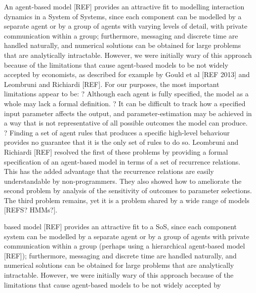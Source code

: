 \documentclass{article}
\begin{document}
An agent-based model [REF] provides an attractive fit to modelling interaction dynamics in a System of Systems, since each component can be modelled by a separate agent or by a group of agents with varying levels of detail, with private communication within a group; furthermore, messaging and discrete time are handled naturally, and numerical solutions can be obtained for large problems that are analytically intractable.  However, we were initially wary of this approach because of the limitations that cause agent-based models to be not widely accepted by economists, as described for example by Gould et al [REF 2013] and Leombruni and Richiardi [REF].  For our purposes, the most important limitations appear to be:
?	Although each agent is fully specified, the model as a whole may lack a formal definition.
?	It can be difficult to track how a specified input parameter affects the output, and parameter-estimation may be achieved in a way that is not representative of all possible outcomes the model can produce. 
?	Finding a set of agent rules that produces a specific high-level behaviour provides no guarantee that it is the only set of rules to do so.
Leombruni and Richiardi [REF] resolved the first of these problems by providing a formal specification of an agent-based model in terms of a set of recurrence relations. This has the added advantage that the recurrence relations are easily understandable by non-programmers.  They also showed how to ameliorate the second problem by analysis of the sensitivity of outcomes to parameter selections.  The third problem remains, yet it is a problem shared by a wide range of models [REFS? HMMs?].





based model [REF] provides an attractive fit to a SoS, since each component system can be modelled by a separate agent or by a group of agents with private communication within a group (perhaps using a hierarchical agent-based model [REF]); furthermore, messaging and discrete time are handled naturally, and numerical solutions can be obtained for large problems that are analytically intractable.  However, we were initially wary of this approach because of the limitations that cause agent-based models to be not widely accepted by 
\end{document}
